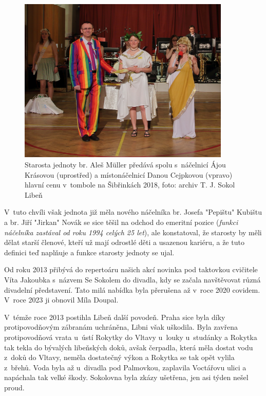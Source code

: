 \documentclass[a5paper, 11pt, twoside]{article}
\begin{document}
\begin{figure}[h]
  \centering 
  \includegraphics[width=0.9\textwidth]{img/63_ales.jpg}
  \caption*{Starosta jednoty br. Aleš Müller předává spolu s~náčelnicí Ájou
  Krásovou (uprostřed) a místonáčelnicí Danou Cejpkovou (vpravo) hlavní
  cenu v~tombole na Šibřinkách 2018, foto: archiv T. J. Sokol Libeň}
\end{figure}

V~tuto chvíli však jednota již měla nového náčelníka br. Josefa
"Pepištu" Kubištu a br. Jiří "Jirkan" Novák se sice těšil na odchod do
emeritní pozice (\textit{funkci náčelníka zastával od roku 1994 celých 25
let}), ale konstatoval, že starosty by měli dělat starší členové, kteří
už mají odrostlé děti a usazenou kariéru, a že tuto definici teď
naplňuje a funkce starosty jednoty se ujal.

Od roku 2013 přibývá do repertoáru našich akcí novinka pod taktovkou
cvičitele Víta Jakoubka s~názvem Se Sokolem do divadla, kdy se začala
navštěvovat různá divadelní představení. Tato milá nabídka byla
přerušena až v~roce 2020 covidem. V~roce 2023 ji obnovil Míla Doupal.

V~témže roce 2013 postihla Libeň další povodeň. Praha sice byla díky
protipovodňovým zábranám uchráněna, Libni však uškodila. Byla zavřena
protipovodňová vrata u~ústí Rokytky do Vltavy u~louky u~studánky a
Rokytka tak tekla do bývalých libeňských doků, avšak čerpadla, která
měla dostat vodu z~doků do Vltavy, neměla dostatečný výkon a Rokytka se
tak opět vylila z~břehů. Voda byla až u~divadla pod Palmovkou, zaplavila
Voctářovu ulici a napáchala tak velké škody. Sokolovna byla zkázy
ušetřena, jen asi týden nešel proud.
\end{document}
